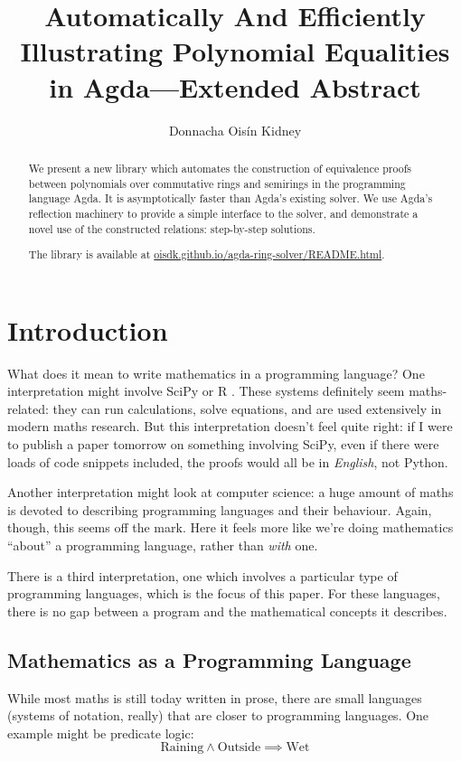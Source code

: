 \documentclass[twocolumn]{article}
\author{Donnacha Oisín Kidney}
\title{Automatically And Efficiently Illustrating Polynomial Equalities in
  Agda---Extended Abstract}
\theoremstyle{definition}
\theoremstyle{definition}
\begin{document}
\maketitle
\begin{abstract}
  We present a new library which automates the construction of equivalence
  proofs between polynomials over commutative rings and semirings in the
  programming language Agda\cite{norell_dependently_2008}. It is asymptotically
  faster than Agda's existing solver. We use Agda's reflection machinery to
  provide a simple interface to the solver, and demonstrate a novel use of the
  constructed relations: step-by-step solutions.

  The library is available at
  \href{https://oisdk.github.io/agda-ring-solver/README.html}{oisdk.github.io/agda-ring-solver/README.html}.
\end{abstract}
\tableofcontents
\section{Introduction}
What does it mean to write mathematics in a programming language? One
interpretation might involve SciPy \cite{jones_scipy_2001} or R
\cite{r_core_team_r_2013}. These systems definitely seem maths-related: they can
run calculations, solve equations, and are used extensively in modern maths
research. But this interpretation doesn't feel quite right: if I were to publish
a paper tomorrow on something involving SciPy, even if there were loads of code
snippets included, the proofs would all be in \emph{English}, not Python. 


Another interpretation might look at computer science: a huge amount of maths is
devoted to describing programming languages and their behaviour. Again, though,
this seems off the mark. Here it feels more like we're doing mathematics
``about'' a programming language, rather than \emph{with} one.

There is a third interpretation, one which involves a particular type of
programming languages, which is the focus of this paper. For these languages,
there is no gap between a program and the mathematical concepts it describes.
\subsection{Mathematics as a Programming Language}
While most maths is still today written in prose, there are small\footnotemark
languages (systems of notation, really) that are closer to programming
languages. One example might be predicate logic:
\[ \text{Raining} \wedge \text{Outside} \implies \text{Wet} \]
\end{document}
